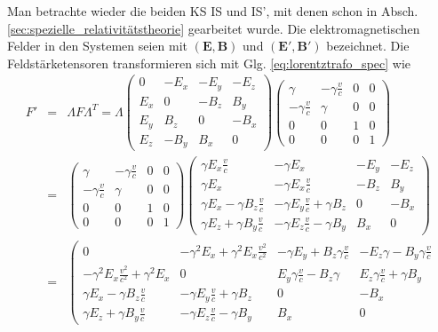 \documentclass{book}
\begin{document}
%
Man betrachte wieder die beiden KS IS und IS', mit denen schon in Absch. \ref{sec:spezielle_relativitätstheorie} gearbeitet wurde. Die elektromagnetischen Felder in den Systemen seien mit $\left(\mathbf{E}, \mathbf{B}\right)$ und $\left(\mathbf{E'}, \mathbf{B'}\right)$ bezeichnet. Die Feldstärketensoren transformieren sich mit Glg. \eqref{eq:lorentztrafo_spec} wie
%
\begin{eqnarray}
F' & = & \Lambda F\Lambda^T = \Lambda\left(\begin{array}{cccc}
0& -E_x& -E_y& -E_z\\
E_x&0& -B_z&B_y\\
E_y&B_z&0& -B_x\\
E_z& -B_y&B_x&0
\end{array}\right)\left(\begin{array}{cccc}
\gamma& -\gamma\frac{v}{c}&0&0\\
- \gamma\frac{v}{c}&\gamma&0&0\\
0&0&1&0\\
0&0&0&1
\end{array}\right)\nonumber\\
& = & \left(\begin{array}{cccc}
\gamma& -\gamma\frac{v}{c}&0&0\\
- \gamma\frac{v}{c}&\gamma&0&0\\
0&0&1&0\\
0&0&0&1
\end{array}\right)\left(\begin{array}{cccc}
\gamma E_x\frac{v}{c}& -\gamma E_x& -E_y& -E_z\\
\gamma E_x& -\gamma E_x\frac{v}{c}& -B_z&B_y\\
\gamma E_x - \gamma B_z\frac{v}{c}& -\gamma E_y\frac{v}{c} + \gamma B_z&0& -B_x\\
\gamma E_z + \gamma B_y\frac{v}{c}& -\gamma E_z\frac{v}{c} - \gamma B_y&B_x&0
\end{array}\right)\nonumber\\
& = & \left(\begin{array}{cccc}
0& -\gamma^2E_x + \gamma^2E_x\frac{v^2}{c^2}& -\gamma E_y + B_z\gamma\frac{v}{c}& -E_z\gamma - B_y\gamma\frac{v}{c}\\
- \gamma^2E_x\frac{v^2}{c^2} + \gamma^2E_x&0&E_y\gamma\frac{v}{c} - B_z\gamma&E_z\gamma\frac{v}{c} + \gamma B_y\\
\gamma E_x - \gamma B_z\frac{v}{c}& -\gamma E_y\frac{v}{c} + \gamma B_z&0& -B_x\\
\gamma E_z + \gamma B_y\frac{v}{c}& -\gamma E_z\frac{v}{c} - \gamma B_y&B_x&0

\end{array}
\end{eqnarray}
\end{document}

